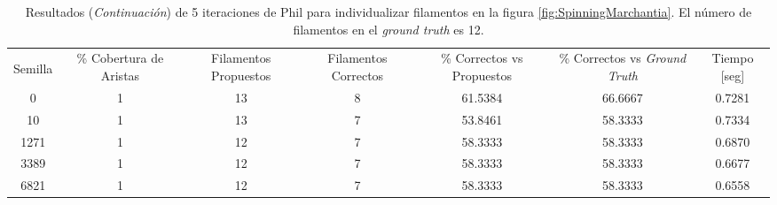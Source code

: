 \begin{table}[h]
    \centering
    \begin{tabular}{|c|c|c|c|c|c|c|}
    \hline
         & \multirow{4}{2cm}{\centering \% Cobertura de Aristas} & \multirow{4}{2cm}{Filamentos Propuestos} & \multirow{4}{2cm}{Filamentos Correctos} & \multirow{4}{2.5cm}{\% Correctos vs Propuestos} & \multirow{4}{2.5cm}{\centering \% Correctos vs {\it Ground Truth}} & \multirow{4}{1.2cm}{\centering Tiempo [seg]} \\
         &  &  &  & & &  \\
        Semilla &  &  &  & & &  \\
        &  &  &  & & &  \\ \hline 
        0 & 1 & 13 & 8 & 61.5384 & 66.6667 & 0.7281  \\
        10 & 1 & 13 & 7 & 53.8461 & 58.3333 & 0.7334\\
        1271 & 1 & 12 & 7 & 58.3333 & 58.3333 & 0.6870\\
        3389 & 1 & 12 & 7 & 58.3333 & 58.3333 & 0.6677\\
        6821 & 1 & 12 & 7 & 58.3333 & 58.3333 & 0.6558\\
        \hline
    \end{tabular}
    \caption{Resultados ({\it Continuaci\'on}) de 5 iteraciones de Phil para individualizar filamentos en la figura \ref{fig:SpinningMarchantia}. El n\'umero de filamentos en el {\it ground truth} es 12.}
\end{table}


